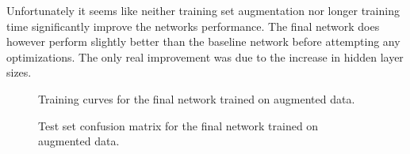 \documentclass{article}
\begin{document}
Unfortunately it seems like neither training set augmentation nor longer
training time significantly improve the networks performance. The final network
does however perform slightly better than the baseline network before
attempting any optimizations. The only real improvement was due to the increase
in hidden layer sizes.

\begin{figure}[H]
  \centering
    
  \caption{Training curves for the final network trained on augmented data.}
  \label{fig:final_curves}
\end{figure}

\begin{figure}[H]
  \centering
    
  \caption{Test set confusion matrix for the final network trained on augmented
           data.}
  \label{fig:final_performance}
\end{figure}
\end{document}
